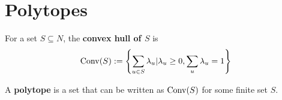 \section{Polytopes}


\begin{definition}
  \label{convex-hull}
  \uses{}
  \leanok
  For a set $S \subseteq N$, the {\bf convex hull of $S$} is
  $$\operatorname{Conv}(S) := \left\{\sum_{u \in S} \lambda_u | \lambda_u \ge 0, \sum_u \lambda_u = 1\right\}$$
\end{definition}


\begin{definition}[Polytope]
    \label{polytope}
  
    A {\bf polytope} is a set that can be written as $\operatorname{Conv}(S)$ for some finite set $S$.
  \end{definition}